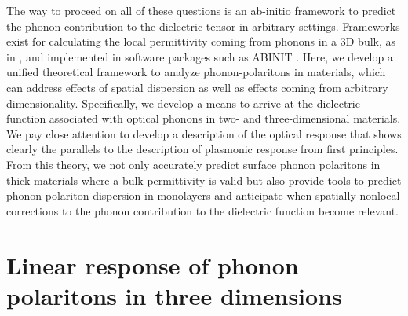 \documentclass[superscriptaddress,reprint,prb]{revtex4-1}
\begin{document}
The way to proceed on all of these questions is an ab-initio framework to predict the phonon contribution to the dielectric tensor in arbitrary settings. Frameworks exist for calculating the local permittivity coming from phonons in a 3D bulk, as in \cite{Gonze1997dynamical}, and implemented in software packages such as ABINIT \cite{abinit1,abinit2,abinit3}. Here, we develop a unified 
theoretical framework to analyze phonon-polaritons in materials, which can address effects of spatial dispersion as well as effects coming from arbitrary dimensionality. Specifically, we develop a means to arrive at the dielectric function associated with optical phonons in two- and three-dimensional materials. We pay close attention to develop a description of the optical response that shows clearly the parallels to the description of plasmonic response from first principles. From this theory, we not only accurately predict surface phonon polaritons in thick materials where a bulk permittivity is valid  but also provide tools to predict phonon polariton dispersion in monolayers and anticipate when spatially nonlocal corrections to the phonon contribution to the dielectric function become relevant. 

\section{Linear response of phonon polaritons in three dimensions}
\end{document}
